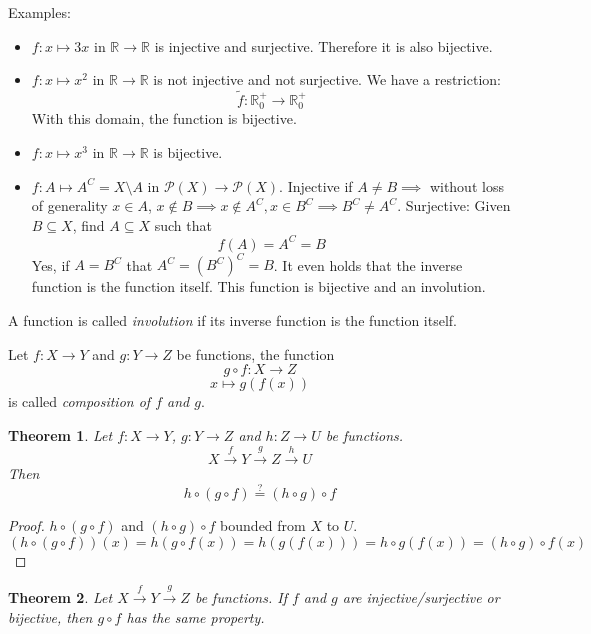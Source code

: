 \documentclass[a4paper,landscape,twocolumn]{article}
\newtheorem{theorem}{Theorem}[section]
\begin{document}
Examples:
\begin{itemize}
  \item
    $f: x \mapsto 3x$ in $\mathbb{R} \rightarrow \mathbb{R}$ is injective and surjective.
    Therefore it is also bijective.
  \item
    $f: x \mapsto x^2$ in $\mathbb{R} \rightarrow \mathbb{R}$ is not injective and not surjective.
    We have a restriction:
    \[ \tilde f: \mathbb{R}_0^+ \rightarrow \mathbb{R}_0^+ \]
    With this domain, the function is bijective.
  \item
    $f: x \mapsto x^3$ in $\mathbb{R} \rightarrow \mathbb{R}$ is bijective.
  \item
    $f: A \mapsto A^C = X \setminus A$ in $\mathcal{P}(X) \rightarrow \mathcal{P}(X)$.
    Injective if $A \neq B \implies $ without loss of generality $x \in A$, $x \not\in B
    \implies x \notin A^C, x \in B^C \implies B^C \neq A^C$.
    Surjective: Given $B \subseteq X$, find $A \subseteq X$ such that
    \[ f(A) = A^C = B \]
    Yes, if $A = B^C$ that $A^C = (B^C)^C = B$.
    It even holds that the inverse function is the function itself.
    This function is bijective and an involution.
\end{itemize}

A function is called \emph{involution} if its inverse function is the function itself.

Let $f: X \rightarrow Y$ and $g: Y \rightarrow Z$ be functions, the function
\[ g \circ f: X \rightarrow Z\]
\[ x \mapsto g(f(x)) \]
is called \emph{composition of $f$ and $g$}.

\begin{theorem}
  Let $f: X\rightarrow Y$, $g: Y\rightarrow Z$ and $h: Z \rightarrow U$ be functions.
  \[ X \xrightarrow{f} Y \xrightarrow{g} Z \xrightarrow{h} U \]
  Then
  \[ h\circ(g\circ f) \overset{?}{=} (h\circ g)\circ f \]
\end{theorem}

\begin{proof}
  $h\circ (g\circ f)$ and $(h\circ g) \circ f$ bounded from $X$ to $U$.
  \[
    (h\circ (g\circ f))(x) =
    h(g\circ f(x)) =
    h(g(f(x))) =
    h\circ g(f(x)) =
    (h\circ g)\circ f(x)
  \]
\end{proof}

\begin{theorem}
  Let $X \xrightarrow{f} Y \xrightarrow{g} Z$ be functions.
  If $f$ and $g$ are injective/surjective or bijective,
  then $g\circ f$ has the same property.
\end{theorem}
\end{document}
